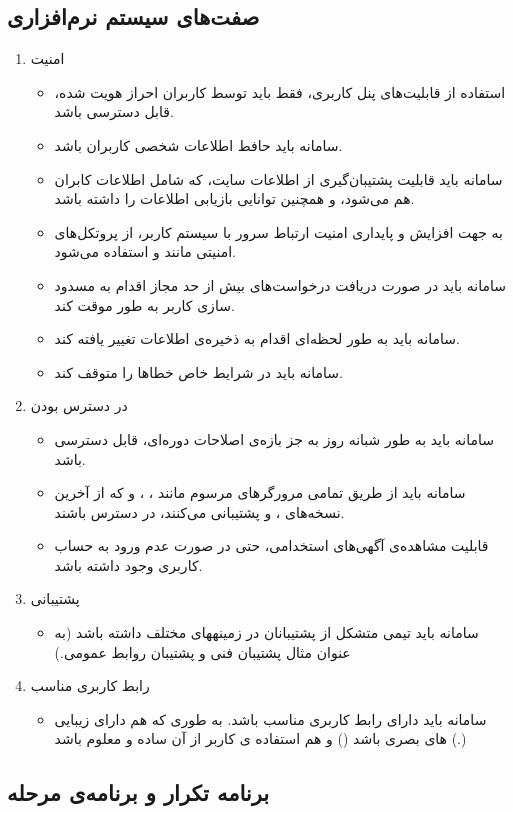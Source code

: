 \documentclass{report}
\begin{document}
			\subsection{صفت‌های سیستم‌ نرم‌افزاری}
				\begin{enumerate}
					\item امنیت
						\begin{itemize}
							\item 
							استفاده از قابلیت‌های پنل کاربری، فقط باید توسط کاربران احراز هویت شده، قابل دسترسی باشد.
							\item 
							سامانه باید حافط اطلاعات شخصی کاربران باشد.
							\item 
							سامانه باید قابلیت پشتیبان‌گیری از اطلاعات سایت، که شامل اطلاعات کابران هم می‌شود، و همچنین توانایی بازیابی اطلاعات را داشته باشد.
							\item 
							به جهت افزایش و پایداری امنیت ارتباط سرور با سیستم کاربر، از پروتکل‌های امنیتی مانند  و  استفاده می‌شود.
							\item 
							سامانه باید در صورت دریافت درخواست‌های بیش از حد مجاز اقدام به مسدود سازی کاربر به طور موقت کند.
							\item 
							سامانه باید به طور لحظه‌ای اقدام به ذخیره‌ی اطلاعات تغییر یافته کند.
							\item 
							سامانه باید در شرایط خاص خطاها را متوقف کند.
						\end{itemize}
					
					\item در دسترس بودن
						\begin{itemize}
							\item 
							سامانه باید به طور شبانه روز به جز بازه‌ی اصلاحات دوره‌ای، قابل دسترسی باشد.
							\item 
							سامانه باید از طریق تمامی مرورگر‌های مرسوم مانند
							، 
							،
							و
							که از آخرین نسخه‌های 
							،
							و
							پشتیبانی می‌کنند، در دسترس باشند.
							\item
							قابلیت مشاهده‌ی آگهی‌های استخدامی، حتی در صورت عدم ورود به حساب کاربری وجود داشته باشد.
						\end{itemize}
					
					\item پشتیبانی
						\begin{itemize}
							\item 
							سامانه باید تیمی متشکل از پشتیبانان در زمینههای مختلف داشته باشد (به عنوان مثال پشتیبان فنی و پشتیبان روابط عمومی.)
						\end{itemize}
					
					\item رابط کاربری مناسب
						\begin{itemize}
							\item 
							سامانه باید دارای رابط کاربری مناسب باشد. به طوری که هم دارای زیبایی های بصری باشد () و هم استفاده ی کاربر از آن ساده و معلوم باشد (.)
						\end{itemize}					
				\end{enumerate}
			\subsection{برنامه تکرار و برنامه‌ی مرحله}
			



\end{document}
